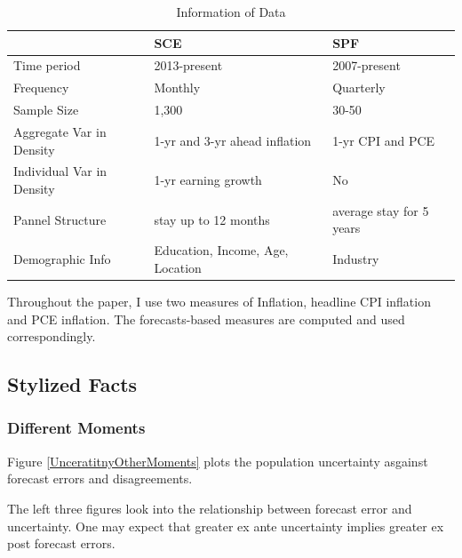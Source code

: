 \documentclass[]{article}
\begin{document}
\begin{table}[ht]
			\caption{Information of Data}
			\label{DataInfo}
	\begin{tabular}{lll} 

		\hline 
		& SCE & SPF        \\
		\hline 
		Time period                                    & 2013-present                            & 2007-present             \\
		Frequency                                      & Monthly                                 & Quarterly                \\
		Sample Size                                    & 1,300                                   & 30-50                    \\
		Aggregate Var in Density                       & 1-yr  and 3-yr ahead inflation          & 1-yr CPI and PCE         \\
		Individual Var in Density                      & 1-yr earning growth                     & No                       \\
		Pannel Structure                               & stay up to 12 months                    & average stay for 5 years \\
		Demographic Info                        & Education, Income, Age, Location        & Industry    \\
		\hline 
	\end{tabular}
\end{table}

Throughout the paper, I use two measures of Inflation, headline CPI inflation and PCE inflation. The forecasts-based measures are computed and used correspondingly.  

\subsection{Stylized Facts}

\subsubsection{Different Moments}

Figure \ref{UnceratitnyOtherMoments} plots the population uncertainty asgainst forecast errors and disagreements. 


The left  three figures look into the relationship between forecast error and uncertainty. One may expect that  greater ex ante uncertainty implies greater ex post forecast errors. 
\end{document}
